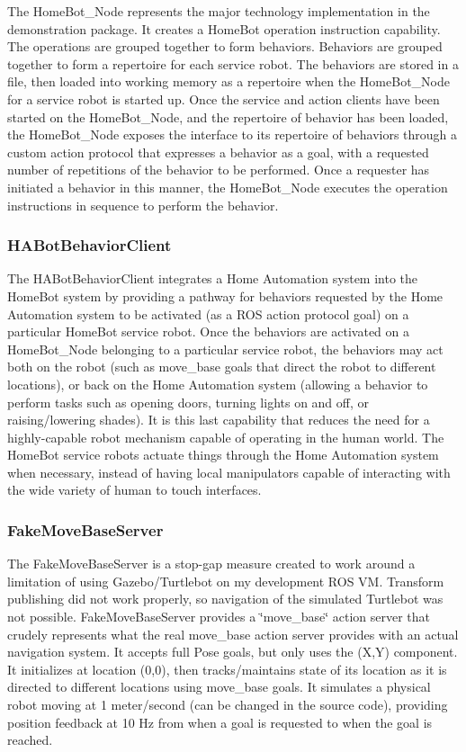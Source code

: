 The Home\-Bot\-\_\-\-Node represents the major technology implementation in the demonstration package. It creates a Home\-Bot operation instruction capability. The operations are grouped together to form behaviors. Behaviors are grouped together to form a repertoire for each service robot. The behaviors are stored in a file, then loaded into working memory as a repertoire when the Home\-Bot\-\_\-\-Node for a service robot is started up. Once the service and action clients have been started on the Home\-Bot\-\_\-\-Node, and the repertoire of behavior has been loaded, the Home\-Bot\-\_\-\-Node exposes the interface to its repertoire of behaviors through a custom action protocol that expresses a behavior as a goal, with a requested number of repetitions of the behavior to be performed. Once a requester has initiated a behavior in this manner, the Home\-Bot\-\_\-\-Node executes the operation instructions in sequence to perform the behavior.

\subsubsection*{H\-A\-Bot\-Behavior\-Client}

The H\-A\-Bot\-Behavior\-Client integrates a Home Automation system into the Home\-Bot system by providing a pathway for behaviors requested by the Home Automation system to be activated (as a R\-O\-S action protocol goal) on a particular Home\-Bot service robot. Once the behaviors are activated on a Home\-Bot\-\_\-\-Node belonging to a particular service robot, the behaviors may act both on the robot (such as move\-\_\-base goals that direct the robot to different locations), or back on the Home Automation system (allowing a behavior to perform tasks such as opening doors, turning lights on and off, or raising/lowering shades). It is this last capability that reduces the need for a highly-\/capable robot mechanism capable of operating in the human world. The Home\-Bot service robots actuate things through the Home Automation system when necessary, instead of having local manipulators capable of interacting with the wide variety of human to touch interfaces.

\subsubsection*{Fake\-Move\-Base\-Server}

The Fake\-Move\-Base\-Server is a stop-\/gap measure created to work around a limitation of using Gazebo/\-Turtlebot on my development R\-O\-S V\-M. Transform publishing did not work properly, so navigation of the simulated Turtlebot was not possible. Fake\-Move\-Base\-Server provides a \char`\"{}move\-\_\-base\char`\"{} action server that crudely represents what the real move\-\_\-base action server provides with an actual navigation system. It accepts full Pose goals, but only uses the (X,Y) component. It initializes at location (0,0), then tracks/maintains state of its location as it is directed to different locations using move\-\_\-base goals. It simulates a physical robot moving at 1 meter/second (can be changed in the source code), providing position feedback at 10 Hz from when a goal is requested to when the goal is reached.

